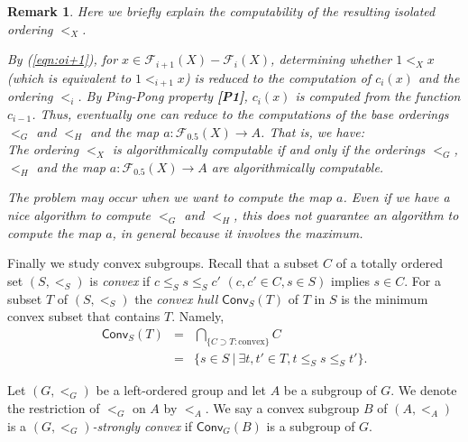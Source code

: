 \documentclass[10pt]{amsart}
\newtheorem{remark}[theorem]{Remark}}
\numberwithin{equation}{section}
\begin{document}
\begin{remark}
\label{rem:computation}
Here we briefly explain the computability of the resulting isolated ordering $<_{X}$. 

By (\ref{eqn:oi+1}), for $x \in {\mathcal{F}}_{i+1}(X)-{\mathcal{F}}_{i}(X)$, determining whether $1 <_{X} x$ (which is equivalent to $ 1 <_{i+1} x$) is reduced to the computation of $c_{i}(x)$ and the ordering $<_{i}$. 
By Ping-Pong property {\bf [P1]}, $c_{i}(x)$ is computed from the function $c_{i-1}$. Thus, eventually one can reduce to the computations of the base orderings $<_{G}$ and $<_{H}$ and the map $a:{\mathcal{F}}_{0.5}(X) \rightarrow A$. That is, we have:\\
\emph{The ordering $<_{X}$ is algorithmically computable if and only if the orderings $<_{G}$, $<_{H}$ and the map $a:{\mathcal{F}}_{0.5}(X) \rightarrow A$ are algorithmically computable.}

The problem may occur when we want to compute the map $a$. Even if we have a nice algorithm to compute $<_{G}$ and $<_{H}$, this does not guarantee an algorithm to compute the map $a$, in general because it involves the maximum.
\end{remark}

Finally we study convex subgroups. Recall that a subset $C$ of a totally ordered set $(S,<_{S})$ is \emph{convex} if $c \leq_{S} s \leq_{S}c'$ $(c,c' \in C, s \in S)$ implies $s \in C$. For a subset $T$ of $(S,<_{S})$ the \emph{convex hull} ${\mathsf{Conv}}_{S}(T)$ of $T$ in $S$ is the minimum convex subset that contains $T$. Namely,
\begin{eqnarray*}
{\mathsf{Conv}}_{S}(T) & = & \bigcap_{\{C\supset T: \text{convex} \}} C\\
& = & \{s \in S \: | \: \exists t,t'\in T, t \leq_{S} s \leq_{S} t' \}.
\end{eqnarray*}

Let $(G,<_{G})$ be a left-ordered group and let $A$ be a subgroup of $G$. We denote the restriction of $<_{G}$ on $A$ by $<_{A}$. We say a convex subgroup $B$ of $(A,<_{A})$ is a \emph{$(G,<_{G})$-strongly convex} if ${\mathsf{Conv}}_{G}(B)$ is a subgroup of $G$.
\end{document}

